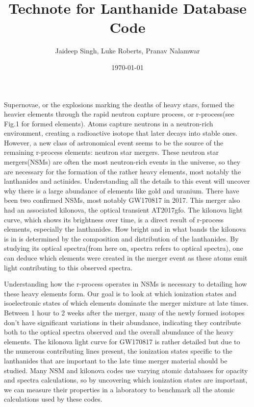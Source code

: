 \documentclass[11pt,a4paper]{article}
\begin{document}
\title{Technote for Lanthanide Database Code}
\author{Jaideep Singh, Luke Roberts, Pranav Nalamwar}
\date{\today}
\maketitle

\par 
Supernovae, or the explosions marking the deaths of heavy stars, formed the heavier elements through the rapid neutron capture process, or r-process(see Fig.1 for formed elements). Atoms capture neutrons in a neutron-rich environment, creating a radioactive isotope that later decays into stable ones. However, a new class of astronomical event seems to be the source of the remaining r-process elements: neutron star mergers. These neutron star mergers(NSMs) are often the most neutron-rich events in the universe, so they are necessary for the formation of the rather heavy elements, most notably the lanthanides and actinides. Understanding all the details to this event will uncover why there is a large abundance of elements like gold and uranium. There have been two confirmed NSMs, most notably GW170817 in 2017. This merger also had an associated kilonova, the optical transient AT2017gfo. The kilonova light curve, which shows its brightness over time, is a direct result of r-process elements, especially the lanthanides. How bright and in what bands the kilonova is in is determined by the composition and distribution of the lanthanides. By studying its optical spectra(from here on, spectra refers to optical spectra), one can deduce which elements were created in the merger event as these atoms emit light contributing to this observed spectra.\par 
Understanding how the r-process operates in NSMs is necessary to detailing how these heavy elements form. Our goal is to look at which ionization states and isoelectronic states of which elements dominate the merger mixture at late times. Between 1 hour to 2 weeks after the merger, many of the newly formed isotopes don’t have significant variations in their abundance, indicating they contribute both to the optical spectra observed and the overall abundance of the heavy elements. The kilonova light curve for GW170817 is rather detailed but due to the numerous contributing lines present, the ionization states specific to the lanthanides that are important to the late time merger material should be studied. Many NSM and kilonova codes use varying atomic databases for opacity and spectra calculations, so by uncovering which ionization states are important, we can measure their properties in a laboratory to benchmark all the atomic calculations used by these codes. 
\end{document}
